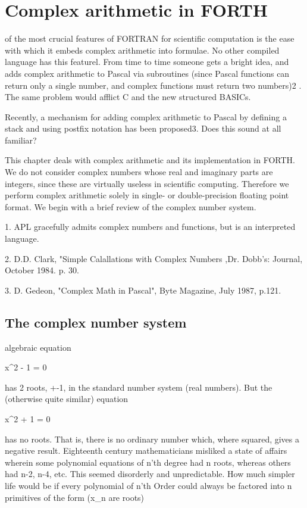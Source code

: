 
\chapter{Complex arithmetic in FORTH}

 of the most crucial features of FORTRAN for scientific computation is the ease with which it embeds complex arithmetic into formulae. No other compiled language has this featurel. From time to time someone gets a bright idea, and adds complex arithmetic to Pascal via subroutines (since Pascal functions can return only a single number, and complex functions must return two numbers)2 . The same problem would afflict C and the new structured BASICs.

Recently, a mechanism for adding complex arithmetic to Pascal by defining a stack and using postfix notation has been proposed3. Does this sound at all familiar?

This chapter deals with complex arithmetic and its implementation in FORTH. We do not consider complex numbers whose real and imaginary parts are integers, since these are virtually useless in scientific computing. Therefore we perform complex arithmetic solely in single- or double-precision floating point format. We begin with a brief review of the complex number system.

 

1. APL gracefully admits complex numbers and functions, but is an interpreted language.

2. D.D. Clark, "Simple Calallations with Complex Numbers ,Dr. Dobb's: Journal, October 1984. p. 30.

3. D. Gedeon, "Complex Math in Pascal", Byte Magazine, July 1987, p.121.

\section{The complex number system}
 algebraic equation

x^2 - 1 = 0

has 2 roots, +-1, in the standard number system (real numbers). But the (otherwise quite similar) equation

x^2 + 1 = 0

has no roots. That is, there is no ordinary number which, where squared, gives a negative result. Eighteenth century mathematicians misliked a state of affairs wherein some polynomial equations of n’th degree had n roots, whereas others had n-2, n-4, etc. This seemed disorderly and unpredictable. How much simpler life would be if every polynomial of n’th Order could always be factored into n primitives of the form (x_n are roots)

